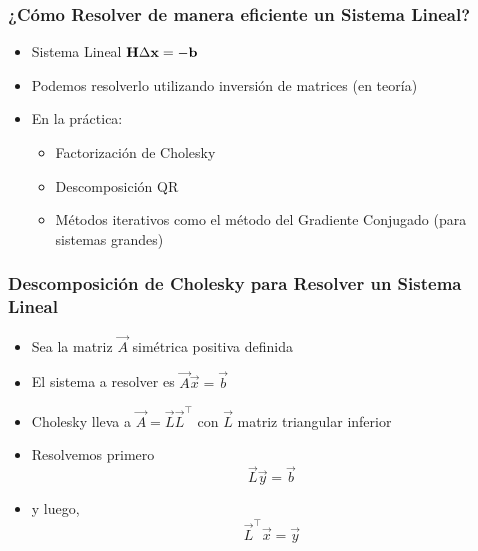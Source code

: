 \begin{frame}
    \frametitle{¿Cómo Resolver de manera eficiente un Sistema Lineal?}
    \begin{itemize}
        \item Sistema Lineal $\boldsymbol{\mathbf{H}} \Delta \boldsymbol{\mathbf{x}} = -\boldsymbol{\mathbf{b}}$
        \item Podemos resolverlo utilizando inversión de matrices (en teoría)
        \item En la práctica:
        \begin{itemize}
            \item Factorización de Cholesky
            \item Descomposición QR
            \item Métodos iterativos como el método del Gradiente Conjugado (para sistemas grandes)
        \end{itemize}
        
    \end{itemize}
    
\end{frame}

\begin{frame}
    \frametitle{Descomposición de Cholesky para Resolver un Sistema Lineal}
    
    \begin{itemize}
        \item Sea la matriz $\vec{A}$ simétrica positiva definida
        \item El sistema a resolver es $\vec{A} \vec{x} = \vec{b}$
        \item Cholesky lleva a $\vec{A} = \vec{L} \vec{L}^{\top}$ con $\vec{L}$ matriz triangular inferior
        \item<2> Resolvemos primero
        \begin{equation*}
            \vec{L} \vec{y} = \vec{b}
        \end{equation*}
        \item<2> y luego,
        \begin{equation*}
            \vec{L}^{\top} \vec{x} = \vec{y}
        \end{equation*}
    
    \end{itemize}
    
\end{frame}

